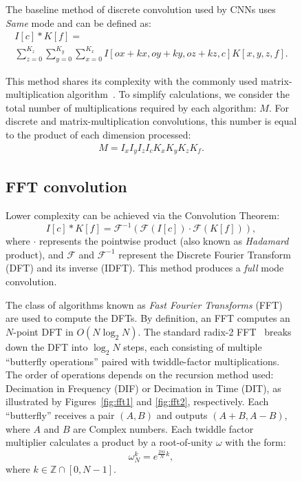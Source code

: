 \begin{figure}[!tb]
  The baseline method of discrete convolution used by CNNs uses \textit{Same} mode and can be defined as:
  \begin{equation}
    \begin{gathered}
      I[c]*K[f] = \\\sum_{z=0}^{K_z}\sum_{y=0}^{K_y}\sum_{x=0}^{K_x}I[ox+kx,oy+ky,oz+kz,c]K[x,y,z,f].
    \end{gathered}
  \end{equation}

  This method shares its complexity with the commonly used matrix-multiplication algorithm~\cite{lera2023hardware}. To simplify calculations, we consider the total number of multiplications required by each algorithm: $M$. For discrete and matrix-multiplication convolutions, this number is equal to the product of each dimension processed:
  \begin{equation}\label{eq:MM-mul}
    \begin{gathered}
      M = I_xI_yI_zI_cK_xK_yK_zK_f.
    \end{gathered}
  \end{equation}

  \subsection{FFT convolution}
    Lower complexity can be achieved via the Convolution Theorem:
    \begin{equation}
      I[c] * K[f] = \mathcal{F}^{-1}(\mathcal{F}(I[c]) \cdot \mathcal{F}(K[f])),
    \end{equation}
    where $\cdot$ represents the pointwise product (also known as \textit{Hadamard} product), and $\mathcal{F}$ and $\mathcal{F}^{-1}$ represent the Discrete Fourier Transform (DFT) and its inverse (IDFT). This method produces a \textit{full} mode convolution.

    The class of algorithms known as \textit{Fast Fourier Transforms} (FFT) are used to compute the DFTs. By definition, an FFT computes an $N$-point DFT in $O(N\log_2N)$. The standard radix-2 FFT~\cite{gauss1866nachlass,cooley1965algorithm} breaks down the DFT into $\log_2N$ steps, each consisting of multiple ``butterfly operations'' paired with twiddle-factor multiplications. The order of operations depends on the recursion method used: Decimation in Frequency (DIF) or Decimation in Time (DIT), as illustrated by Figures~\ref{fig:fft1} and \ref{fig:fft2}, respectively. Each ``butterfly'' receives a pair $(A,B)$ and outputs $(A+B,A-B)$, where $A$ and $B$ are Complex numbers. Each twiddle factor multiplier calculates a product by a root-of-unity $\omega$ with the form:
    \begin{equation}
      \omega_{N}^{k} = e^{\frac{2{\pi}i}{N}k},
    \end{equation}
    where $k \in \mathbb{Z} \cap [0,N-1]$.
    

\end{figure}
